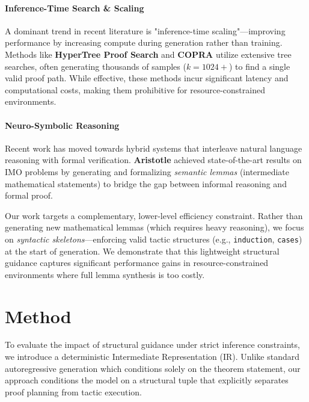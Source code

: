 \documentclass{article}
\begin{document}
\paragraph{Inference-Time Search \& Scaling}
A dominant trend in recent literature is "inference-time scaling"—improving performance by increasing compute during generation rather than training. Methods like \textbf{HyperTree Proof Search} \cite{lample2022hypertree} and \textbf{COPRA} \cite{thakur2023copra} utilize extensive tree searches, often generating thousands of samples ($k=1024+$) to find a single valid proof path. While effective, these methods incur significant latency and computational costs, making them prohibitive for resource-constrained environments.

\paragraph{Neuro-Symbolic Reasoning}
Recent work has moved towards hybrid systems that interleave natural language reasoning with formal verification. \textbf{Aristotle} \cite{achim2025aristotle} achieved state-of-the-art results on IMO problems by generating and formalizing \textit{semantic lemmas} (intermediate mathematical statements) to bridge the gap between informal reasoning and formal proof.

Our work targets a complementary, lower-level efficiency constraint. Rather than generating new mathematical lemmas (which requires heavy reasoning), we focus on \textit{syntactic skeletons}—enforcing valid tactic structures (e.g., \texttt{induction}, \texttt{cases}) at the start of generation. We demonstrate that this lightweight structural guidance captures significant performance gains in resource-constrained environments where full lemma synthesis is too costly.


\section{Method}

To evaluate the impact of structural guidance under strict inference constraints, we introduce a deterministic Intermediate Representation (IR). Unlike standard autoregressive generation which conditions solely on the theorem statement, our approach conditions the model on a structural tuple that explicitly separates proof planning from tactic execution.
\end{document}
